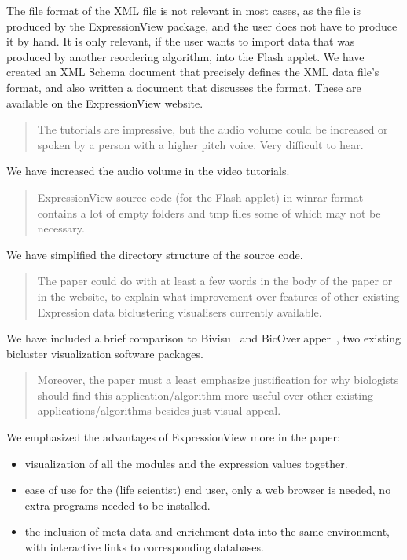 \documentclass[a4paper]{article}
\newenvironment{myquote}{\begin{quote}\color{blue}}{\end{quote}}
\begin{document}
The file format of the XML file is not relevant in most cases, as the
file is produced by the ExpressionView package, and the user does not
have to produce it by hand. It is only relevant, if the user wants to
import data that was produced by another reordering algorithm, into
the Flash applet. We have created an XML Schema document that precisely
defines the XML data file's format, and also written a document that
discusses the format. These are available on the ExpressionView website.

\begin{myquote}
The tutorials are impressive, but the audio volume could be increased
or spoken by a person with a higher pitch voice. Very difficult to
hear.  
\end{myquote}

We have increased the audio volume in the video tutorials.

\begin{myquote}
ExpressionView source code (for the Flash applet) in winrar
format contains a lot of empty folders and tmp files some of which may
not be necessary. 
\end{myquote}

We have simplified the directory structure of the source code.

\begin{myquote}
The paper could do with at least a few words in the body of the paper
or in the website, to explain what improvement over features of other
existing Expression data biclustering visualisers currently
available. 
\end{myquote}

We have included a brief comparison to Bivisu~\citep{cheng07} and
BicOverlapper~\citep{santamaria08}, two existing bicluster
visualization software packages.

\begin{myquote}
Moreover, the paper must a least emphasize justification
for why biologists should find this application/algorithm more useful
over other existing applications/algorithms besides just visual
appeal. 
\end{myquote}

We emphasized the advantages of ExpressionView more in the paper:
\begin{itemize}
\item visualization of all the modules and the expression values together.
\item ease of use for the (life scientist) end user, only a web browser is
  needed, no extra programs needed to be installed.
\item the inclusion of meta-data and enrichment data into the same
  environment, with interactive links to corresponding databases.
\end{itemize}
\end{document}
